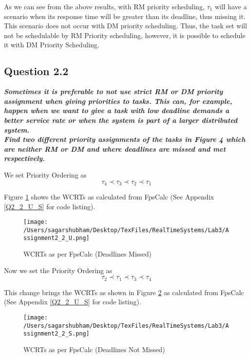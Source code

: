 \documentclass[oneside,a4paper]{article}
\begin{document}
As we can see from the above results, with RM priority scheduling, $\tau_1$ will have a scenario when its response time will be greater than its deadline, thus missing it. This scenario does not occur with DM priority scheduling. Thus, the task set will not be schedulable by RM Priority scheduling, however, it is possible to schedule it with DM Priority Scheduling.
\pagebreak 
\subsection*{\normalsize{Question 2.2}}
\textit{\textbf{Sometimes it is preferable to not use strict RM or DM priority assignment when giving priorities to tasks. This can, for example, happen when we want to give a task with low deadline demands a better service rate or when the system is part of a larger distributed system. \\
Find two different priority assignments of the tasks in Figure 4 which are neither RM or DM and where deadlines are missed and met respectively.}}\par
We set Priority Ordering as
$$\tau_4 \prec \tau_3 \prec \tau_2\prec \tau_1$$\par
Figure \ref{figure8} shows the WCRTs as calculated from FpsCalc (See Appendix \ref{Q2_2_U_S} for code listing).
\begin{center}
\begin{figure}[H]
                    \centering
                    \texttt{[image: /Users/sagarshubham/Desktop/TexFiles/RealTimeSystems/Lab3/Assignment2\_2\_U.png]}
                    \caption[Figure for Question 2.2 Deadline Missed Schedule]{WCRTs as per FpsCalc (Deadlines Missed)}
                    \label{figure8}        
\end{figure}
\end{center}\par
\pagebreak
Now we set the Priority Ordering as
$$\tau_2 \prec \tau_1 \prec \tau_3 \prec \tau_4$$\par
This change brings the WCRTs as shown in Figure \ref{figure9} as calculated from FpsCalc (See Appendix \ref{Q2_2_U_S} for code listing).
\begin{center}
\begin{figure}[H]
                    \centering
                    \texttt{[image: /Users/sagarshubham/Desktop/TexFiles/RealTimeSystems/Lab3/Assignment2\_2\_S.png]}
                    \caption[Figure for Question 2.2 Deadline Not Missed Schedule]{WCRTs as per FpsCalc (Deadlines Not Missed)}
                    \label{figure9}        
\end{figure}
\end{center}\par
\end{document}
